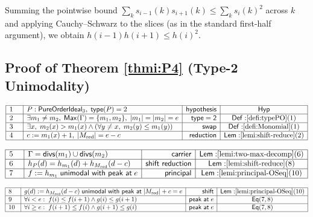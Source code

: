 \documentclass[11pt,reqno]{amsart}
\begin{document}
Summing the pointwise bound $\sum_{k}s_{i-1}(k)s_{i+1}(k)\le%
\sum_{k}s_{i}(k)^{2}$ across $k$ and applying Cauchy--Schwarz to the slices
(as in the standard first-half argument), we obtain $h(i-1)h(i+1)\le h(i)^{2}
$.

\medskip


\subsection*{Proof of Theorem \protect\ref{thmi:P4} (Type-2 Unimodality)}

\noindent$%
\begin{array}{|m{0.5cm}|l|r|c|}
\hline
1 & P:\mathsf{PureOrderIdeal}_{3},\;\mathsf{type}(P)=2 & \mathsf{hypothesis}
& \mathsf{Hyp} \\ \hline
2 & \exists m_{1}\ne m_{2},\;\mathsf{Max}(\Gamma)=\{m_{1},m_{2}\},%
\;|m_{1}|=|m_{2}|=e & \mathsf{type=2} & \mathsf{Def:}\ref{defi:typePO}(1) \\ 
\hline
3 & \exists x,\;m_{2}(x)>m_{1}(x)\wedge(\forall y\ne x,\;m_{2}(y)\le
m_{1}(y)) & \mathsf{swap} & \mathsf{Def:}\ref{defi:Monomial}(1) \\ \hline
4 & c:=m_{1}(x)+1,\;|M_{\mathrm{red}}|=e-c & \mathsf{reduction} & \mathsf{%
Lem:}\ref{lemi:shift-reduce}(2) \\ \hline
\end{array}%
$

\nointerlineskip\noindent$%
\begin{array}{|m{0.5cm}|l|r|c|}
\hline
5 & \Gamma=\mathsf{divs}(m_{1})\cup\mathsf{divs}(m_{2}) & \mathsf{carrier} & 
\mathsf{Lem:}\ref{lemi:two-max-decomp}(6) \\ \hline
6 & h_{P}(d)=h_{m_{1}}(d)+h_{M_{\mathrm{red}}}(d-c) & \mathsf{shift\
reduction} & \mathsf{Lem:}\ref{lemi:shift-reduce}(8) \\ \hline
7 & f:=h_{m_{1}}\;\mathsf{unimodal\ with\ peak\ at}\;e & \mathsf{principal}
& \mathsf{Lem:}\ref{lemi:principal-OSeq}(10) \\ \hline
\end{array}%
$

\nointerlineskip\noindent$%
\begin{array}{|m{0.5cm}|l|r|c|}
\hline
8 & g(d):=h_{M_{\mathrm{red}}}(d-c)\;\mathsf{unimodal\ with\ peak\ at}\;|M_{%
\mathrm{red}}|+c=e & \mathsf{shift} & \mathsf{Lem:}\ref{lemi:principal-OSeq}%
(10) \\ \hline
9 & \forall i<e:\;f(i)\le f(i+1)\wedge g(i)\le g(i+1) & \mathsf{peak\ at}\;e
& \mathsf{Eq}(7,8) \\ \hline
10 & \forall i\ge e:\;f(i+1)\le f(i)\wedge g(i+1)\le g(i) & \mathsf{peak\ at}%
\;e & \mathsf{Eq}(7,8) \\ \hline
\end{array}%
$
\end{document}
